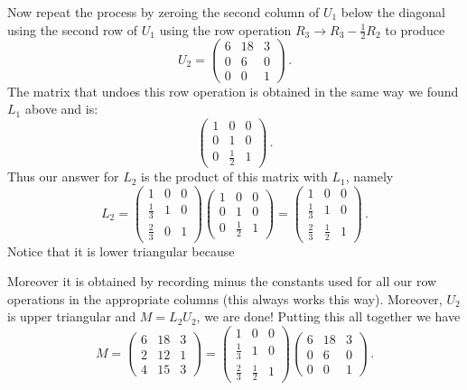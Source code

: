 Now repeat the process by zeroing the second column of $U_1$ below the diagonal using the second row of $U_1$ using the row operation
$R_3\to R_3-\frac 12 R_2$ to produce
$$U_2=\begin{pmatrix}6&18&3\\0&6&0\\0&0&1\end{pmatrix}\, .$$
The matrix that undoes this row operation is obtained in the same way we found $L_1$ above and is:
$$
\begin{pmatrix}
1&0&0\\
0&1&0\\
0&\frac 12& 1
\end{pmatrix}\, .
$$
Thus our answer for $L_2$ is the product of this matrix with $L_1$, namely
$$
L_2=
\begin{pmatrix}
1 & 0 & 0 \\[1mm]
\frac{1}{3} & 1 & 0 \\[1mm]
\frac{2}{3} & 0 & 1 
\end{pmatrix}\begin{pmatrix}
1&0&0\\
0&1&0\\
0&\frac 12& 1
\end{pmatrix}
=\begin{pmatrix}
1 & 0 & 0 \\[1mm]
\frac{1}{3} & 1 & 0 \\[1mm]
\frac{2}{3} & \frac{1}{2} & 1 
\end{pmatrix}\, .
$$
Notice that it is lower triangular because 

\begin{center}
\end{center}

\noindent
Moreover it is obtained by recording minus the constants used for all our row operations in the appropriate columns (this always works this way).
Moreover, $U_2$ is upper triangular and $M=L_2U_2$, we are done!
Putting this all together we have
$$M=\begin{pmatrix}
6 & 18 & 3 \\
2 & 12 & 1 \\
4 & 15 & 3 
\end{pmatrix}= \begin{pmatrix}
1 & 0 & 0 \\[1mm]
\frac{1}{3} & 1 & 0 \\[1mm]
\frac{2}{3} & \frac{1}{2} & 1 
\end{pmatrix}\begin{pmatrix}
6 & 18 & 3 \\[1mm]
0 & 6 & 0 \\[1mm]
0 & 0 & 1 
\end{pmatrix}\, .$$  

